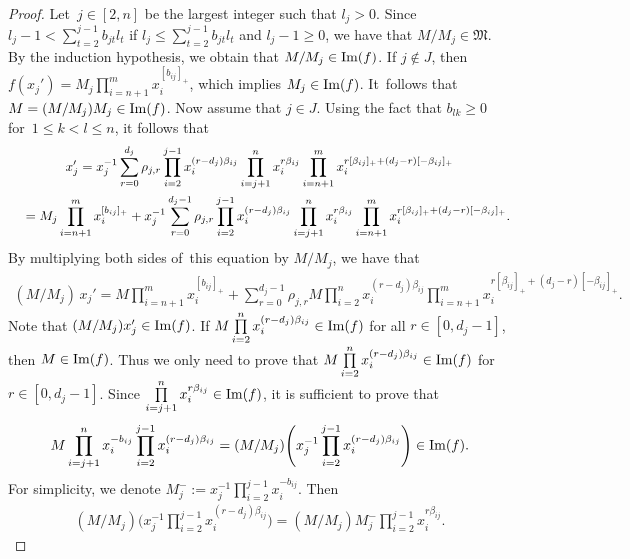 \documentclass[pdftex]{sigma}
\numberwithin{equation}{section}
\begin{document}
\begin{proof}
Let~$j\in[2,n]$ be the largest integer such that $l_{j}>0$. Since $l_{j}-1 <\sum\limits_{t=2}^{j-1}b_{jt}l_{t}$ if $l_{j} \leq\sum\limits_{t=2}^{j-1}b_{jt}l_{t}$ and $l_j-1\geq0$, we have that $M/M_j\in\mathfrak{M}$. By the induction hypothesis, we obtain that $M/M_j\in\mathop{\rm Im}(f)$. If $j\notin J$, then $f(x_{j}')=M_j\prod\limits_{i=n+1}^{m}x_{i}^{[b_{ij}]_+}$, which implies $M_j\in \mathop{\rm Im}(f)$. It~fol\-lows that $M=(M/M_j) M_j\in\mathop{\rm Im}(f)$. Now assume that $j\in J$. Using the fact that $b_{lk}\geq0$ for~$1\leq k< l\leq n$, it follows that
\begin{gather*}
 x_{j}'= x_{j}^{-1}\sum\limits_{r=0}^{d_j}\rho_{j,r} \prod\limits_{i=2}^{j-1}x_{i}^{(r-d_j)\beta_{ij}} \prod\limits_{i=j+1}^{n}x_{i}^{r\beta_{ij} } \prod\limits_{i=n+1}^{m}x_{i}^{r[\beta_{ij}]_{+} +(d_j-r)[-\beta_{ij}]_+}
 \\ \hphantom{x_{j}'}
{}= M_j\prod\limits_{i=n+1}^{m}x_{i}^{[b_{ij}]_{+}} +x_{j}^{-1}\sum\limits_{r=0}^{d_j-1}\rho_{j,r} \prod\limits_{i=2}^{j-1}x_{i}^{(r-d_j)\beta_{ij}} \prod\limits_{i=j+1}^{n}x_{i}^{r\beta_{ij} } \prod\limits_{i=n+1}^{m}x_{i}^{r[\beta_{ij}]_{+} +(d_j-r)[-\beta_{ij}]_+}.
\end{gather*}
By multiplying both sides of~this equation by $M/M_j$, we have that
\begin{gather*}
(M/M_j)\, x_{j}'= M\prod\limits_{i=n+1}^{m}x_{i}^{[b_{ij}]_{+}} + \sum\limits_{r=0}^{d_j-1}\rho_{j,r} M\prod\limits_{i=2}^{n}x_{i}^{(r-d_j)\beta_{ij}} \prod\limits_{i=n+1}^{m}x_{i}^{r[\beta_{ij}]_{+} +(d_j-r)[-\beta_{ij}]_+}.
\end{gather*}
Note that $(M/M_j) x_{j}'\in\mathop{\rm Im}(f)$. If $M\prod\limits_{i=2}^{n}x_{i}^{(r-d_j)\beta_{ij}} \in \mathop{\rm Im}(f)$ for all $r\in[0,d_j-1]$, then $M\in\mathop{\rm Im}(f)$.
Thus we only need to prove that $M\prod\limits_{i=2}^{n}x_{i}^{(r-d_j)\beta_{ij}} \in \mathop{\rm Im}(f)$ for $r\in[0,d_j-1]$. Since $\prod\limits_{i=j+1}^{n}x_{i}^{r\beta_{ij}}\in \mathop{\rm Im}(f)$, it is sufficient to prove that
\begin{gather*}
M\prod\limits_{i=j+1}^{n}x_{i}^{-b_{ij}} \prod\limits_{i=2}^{j-1}x_{i}^{(r-d_j)\beta_{ij}} =(M/M_j)\Bigg(x_{j}^{-1} \prod\limits_{i=2}^{j-1}x_{i}^{(r-d_j)\beta_{ij}}\Bigg) \in \mathop{\rm Im}(f).
\end{gather*}
For simplicity, we denote $M_{j}^{-}:=x_{j}^{-1}\prod\limits_{i=2}^{j-1}x_{i}^{-b_{ij}}$. Then
\begin{gather*}
(M/M_j)\Bigg(x_{j}^{-1} \prod\limits_{i=2}^{j-1}x_{i}^{(r-d_j)\beta_{ij}}\Bigg)
=(M/M_j)M_{j}^{-}\prod\limits_{i=2}^{j-1}x_{i}^{r\beta_{ij}}.
\end{gather*}



\end{proof}
\end{document}
